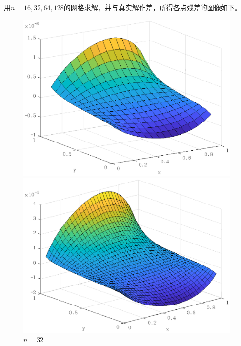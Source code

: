 \documentclass[lang=cn,11pt,a4paper]{elegantpaper}
\begin{document}
用$n=16,32,64,128$的网格求解，并与真实解作差，所得各点残差的图像如下。

\begin{figure}[htbp]
  \centering
  \begin{minipage}[t]{0.24\linewidth}
      \centering
      \includegraphics[width=0.95\linewidth]{figure/error_problem1_m_r_n=16.eps}
      \caption*{$n=16$}
  \end{minipage}
  \begin{minipage}[t]{0.24\linewidth}
    \centering
    \includegraphics[width=0.95\linewidth]{figure/error_problem1_m_r_n=32.eps}
    \caption*{$n=32$}
  \end{minipage}
  \begin{minipage}[t]{0.24\linewidth}
    \centering

\end{minipage}
\end{figure}
\end{document}
